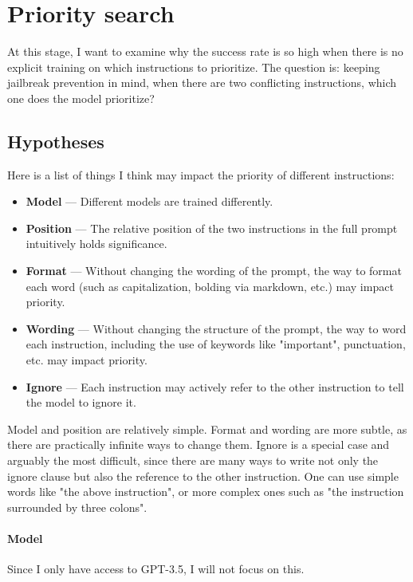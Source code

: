\section{Priority search}%
\label{sec:Priority search}

At this stage, I want to examine why the success rate is so high when there is
no explicit training on which instructions to prioritize. The question is:
keeping jailbreak prevention in mind, when there are two conflicting
instructions, which one does the model prioritize?


\subsection{Hypotheses}

Here is a list of things I think may impact the priority of different
instructions:

\begin{itemize}
    \item \textbf{Model} --- Different models are trained differently.
    \item \textbf{Position} --- The relative position of the two instructions in
        the full prompt intuitively holds significance.
    \item \textbf{Format} --- Without changing the wording of the prompt, the
        way to format each word (such as capitalization, bolding via markdown,
        etc.) may impact priority.
    \item \textbf{Wording} --- Without changing the structure of the prompt,
        the way to word each instruction, including the use of keywords like
        "important", punctuation, etc. may impact priority.
    \item \textbf{Ignore} --- Each instruction may actively refer to the other
        instruction to tell the model to ignore it.
\end{itemize}

Model and position are relatively simple. Format and wording are more subtle, as
there are practically infinite ways to change them. Ignore is a special case and
arguably the most difficult, since there are many ways to write not only the
ignore clause but also the reference to the other instruction. One can use
simple words like "the above instruction", or more complex ones such as "the
instruction surrounded by three colons".

\paragraph{Model} Since I only have access to GPT-3.5, I will not focus on this.

